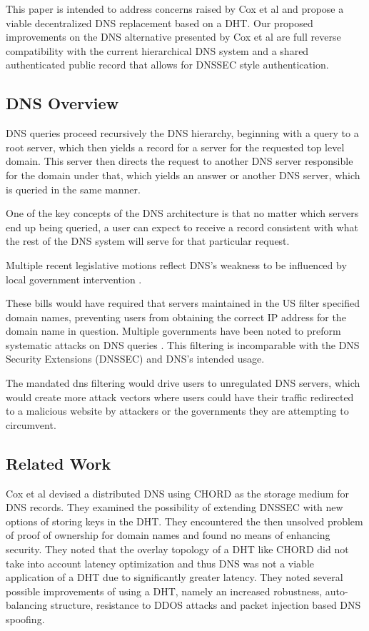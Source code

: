 \documentclass[11pt]{IEEEtran} %
\begin{document}
This paper is intended to address concerns raised by Cox et al\cite{cox} and propose a viable decentralized DNS replacement based on a DHT. Our proposed improvements on the DNS alternative presented by Cox et al are full reverse compatibility with the current hierarchical DNS system and a shared authenticated public record that allows for DNSSEC style authentication.


\subsection{DNS Overview}

DNS queries proceed recursively the DNS hierarchy, beginning with a query to a root server, which then yields a record for a server for the requested top level domain.  This server then directs the request to another DNS server responsible for the domain under that, which yields an answer or another DNS server, which is queried in the same manner.

One of the key concepts of the DNS architecture is that no matter which servers end up being queried, a user can expect to receive a record consistent with what the rest of the DNS system will serve for that particular request.


Multiple recent legislative motions reflect DNS's weakness to be influenced by local government intervention \cite{sopa} \cite{lemley2011don} \cite{crocker2011security}.

These bills would have required that servers maintained in the US filter specified domain names, preventing users from obtaining the correct IP address for the domain name in question. Multiple governments have been noted to preform systematic attacks on DNS queries \cite{inject}. This filtering is incomparable with the DNS Security Extensions (DNSSEC) \cite{crocker2011security} and DNS's intended usage. 

The mandated dns filtering would drive users to unregulated DNS servers, which would create more attack vectors where users could have their traffic redirected to a malicious website by attackers or the governments they are attempting to circumvent.

\subsection{Related Work}

Cox et al devised a distributed DNS using CHORD\cite{chord} as the storage medium for DNS records. They examined the possibility of extending DNSSEC with new options of storing keys in the DHT. They encountered the then unsolved problem of proof of ownership for domain names and found no means of enhancing security. They noted that the overlay topology of a DHT like CHORD did not take into account latency optimization and thus DNS was not a viable application of a DHT due to significantly greater latency. They noted several possible improvements of using a DHT, namely an increased robustness, auto-balancing structure, resistance to DDOS attacks and packet injection based DNS spoofing.
\end{document}

